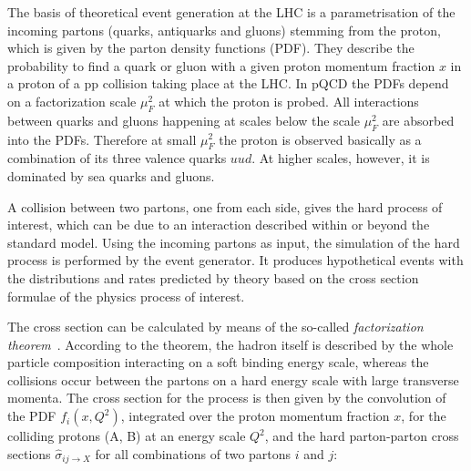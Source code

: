 The basis of theoretical event generation at the LHC is a parametrisation of the incoming partons (quarks, antiquarks and gluons) stemming from the proton, which is given by the parton density functions (PDF).
They describe the probability to find a quark or gluon with a given proton momentum fraction $x$ in a proton of a pp collision taking place at the LHC.
In pQCD the PDFs depend on a factorization scale $\mu^2_F$ at which the proton is probed.
All interactions between quarks and gluons happening at scales below the scale $\mu^2_F$ are absorbed into the PDFs. Therefore at small $\mu^2_F$ the proton is observed basically as a combination of its
three valence quarks $uud$. At higher scales, however, it is dominated by sea quarks and gluons.

A collision between two partons, one from each side, gives the hard process of interest, which can be due to an interaction described within or beyond the standard model.
Using the incoming partons as input, the simulation of the hard process is performed by the event generator.
It produces hypothetical events with the distributions and rates predicted by theory based on the cross section formulae of the physics process of interest.

The cross section can be calculated by means of the so-called \textit{factorization theorem}~\cite{Collins:1987pm}.
According to the theorem, the hadron itself is described by the whole particle composition interacting on a soft binding energy scale,
whereas the collisions occur between the partons on a hard energy scale with large transverse momenta.
The cross section for the process is then given by the convolution of the PDF $f_i(x,Q^2)$, integrated over the proton momentum fraction $x$, for the colliding protons (A, B) at an energy scale $Q^2$,
and the hard parton-parton cross sections $\hat{\sigma}_{ij \to X}$ for all combinations of two partons $i$ and $j$:

